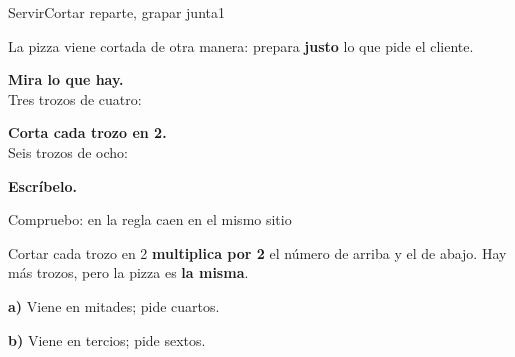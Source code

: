 \documentclass[12pt]{article}
\begin{document}
\begin{ficha}{Servir}{Cortar reparte, grapar junta}{1}

\begin{encargo}
La pizza viene cortada de otra manera: prepara \textbf{justo} lo que pide el cliente.
\end{encargo}


\vspace{2mm}
\begin{minipage}[c]{.5\linewidth}
\textbf{Mira lo que hay.}\\[1mm]
\hspace*{6mm}Tres trozos de cuatro:\ 
\end{minipage}%
\begin{minipage}[c]{.5\linewidth}
\textbf{Corta cada trozo en 2.}\\[1mm]
\hspace*{6mm}Seis trozos de ocho:\ 
\end{minipage}

\vspace{2mm}
\begin{minipage}[c]{.5\linewidth}
\textbf{Escríbelo.}\quad {}
\end{minipage}%
\begin{minipage}[c]{.5\linewidth}
{\small Compruebo: en la regla caen en el mismo sitio \bien}\\[1mm]
\end{minipage}

\vspace{1mm}
\begin{nick}
Cortar cada trozo en 2 \textbf{multiplica por 2} el número de arriba y el de
abajo. Hay más trozos, pero la pizza es \textbf{la misma}.
\end{nick}


\vspace{1mm}
\begin{minipage}[t]{.5\linewidth}\vspace{0pt}
\textbf{a)} Viene en mitades; pide cuartos.\\[.5mm]
\quad{}
\end{minipage}%
\begin{minipage}[t]{.5\linewidth}\vspace{0pt}
\textbf{b)} Viene en tercios; pide sextos.\\[.5mm]
\quad{}
\end{minipage}


\end{ficha}
\end{document}
